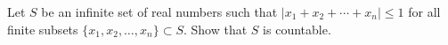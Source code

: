 Let \(S\) be an infinite set of real numbers such that \(|x_1+x_2+\cdots + x_n | \leq 1 \) for all finite subsets \(\{x_1,x_2,\ldots,x_n\} \subset S\). Show that \(S\) is countable.